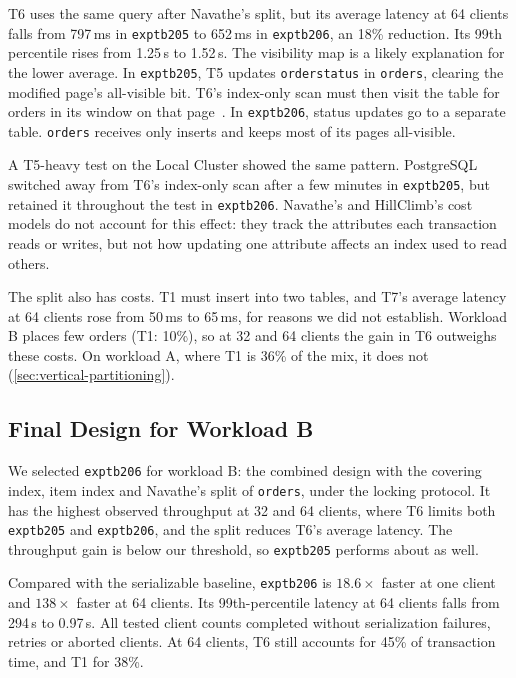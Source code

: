 \documentclass[sigconf,10pt,nonacm]{acmart}
\newcommand{\expt}[1]{\texttt{expt\textunderscore #1}}
\renewcommand{\_}{\underscorewithoutbreak\allowbreak}
\begin{document}
T6 uses the same query after Navathe's split, but its average latency at 64
clients falls from 797\,ms in \expt{b205} to 652\,ms in \expt{b206}, an 18\%
reduction. Its 99th percentile rises from 1.25\,s to 1.52\,s. The visibility map
is a likely explanation for the lower average. In \expt{b205}, T5 updates
\texttt{order\_status} in \texttt{orders}, clearing the modified page's all-visible
bit. T6's index-only scan must then visit the table for orders in its window on
that page~\cite{pgindexonly, pgvisibilitymap}. In \expt{b206}, status updates go
to a separate table. \texttt{orders} receives only inserts and keeps most of its
pages all-visible.

A T5-heavy test on the Local Cluster showed the same pattern. PostgreSQL switched
away from T6's index-only scan after a few minutes in \expt{b205}, but retained
it throughout the test in \expt{b206}. Navathe's and HillClimb's cost models do
not account for this effect: they track the attributes each transaction reads or
writes, but not how updating one attribute affects an index used to read others.

The split also has costs. T1 must insert into two tables, and T7's average latency at
64 clients rose from 50\,ms to 65\,ms, for reasons we did not establish. Workload B
places few orders (T1: 10\%), so at 32 and 64 clients the gain in T6 outweighs these
costs. On workload A, where T1 is 36\% of the mix, it does not
(\cref{sec:vertical-partitioning}).

\subsection{Final Design for Workload B}
\label{sec:final-b}

We selected \expt{b206} for workload B: the combined design with the covering
index, item index and Navathe's split of \texttt{orders}, under the locking
protocol. It has the highest observed throughput at 32 and 64 clients, where T6
limits both \expt{b205} and \expt{b206}, and the split reduces T6's average
latency. The throughput gain is below our threshold, so \expt{b205} performs
about as well.

Compared with the serializable baseline, \expt{b206} is $18.6\times$ faster at
one client and $138\times$ faster at 64 clients. Its 99th-percentile latency at
64 clients falls from 294\,s to 0.97\,s. All tested client counts completed
without serialization failures, retries or aborted clients. At 64 clients, T6
still accounts for 45\% of transaction time, and T1 for 38\%.
\end{document}
